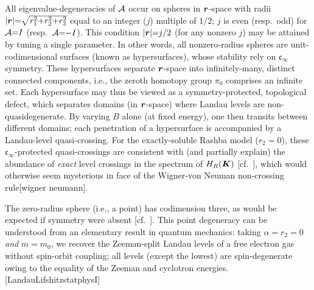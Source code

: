 \documentclass[aps, prb, showpacs, twocolumn, notitlepage, superscriptaddress]{revtex4-1}
\begin{document}
All eigenvalue-degeneracies of ${\cal A}$ occur on spheres in $\boldsymbol{r}$-space with radii $|\boldsymbol{r}|{=}\sqrt{r_1^2{+}r_2^2{+}r_3^2}$ equal to an integer ($j$)  multiple of $1/2$;  ${j}$ is even (resp.\  odd) for  ${\cal A}{=}I$ (resp.\ ${\cal A}{=}{-}I$).  This condition $|\boldsymbol{r}|{=}j/2$ (for any nonzero $j$) may be attained by tuning a single parameter. In other words,
all nonzero-radius spheres are unit-codimensional surfaces (known as hypersurfaces), whose stability rely on $\mathfrak{c}_{\infty}$ symmetry. These hypersurfaces separate $\boldsymbol{r}$-space into infinitely-many, distinct connected components, i.e., the zeroth homotopy group $\pi_0$ comprises an infinite set. Each hypersurface may thus be viewed as a symmetry-protected, topological defect, which separates domains (in $\boldsymbol{r}$-space) where Landau levels are non-quasidegenerate. By varying $B$ alone (at fixed energy), one then transits between different domains; each penetration of a hypersurface is accompanied by a Landau-level quasi-crossing. For the exactly-soluble Rashba model ($r_2{=}0$), these $\mathfrak{c}_{\infty}$-protected quasi-crossings  are consistent with (and partially explain)  the abundance of \textit{exact} level crossings in the spectrum of $H_R(\boldsymbol{K})$ [cf.\ ], which would otherwise seem mysterious in face of  the Wigner-von Neuman non-crossing rule[wigner neumann].


The zero-radius sphere (i.e., a point) has codimension three, as would be expected if symmetry were absent [cf.\ ].    This point degeneracy can be understood from an elementary result in quantum mechanics: taking $\alpha{=}r_2{=}0$ \textit{and} $m{=}m_0$, we recover the Zeeman-split Landau levels of a free electron gas without spin-orbit coupling; all levels (except the lowest) are spin-degenerate owing to the equality of the Zeeman and cyclotron energies.[LandauLifshitzstatphysI]  




\end{document}
